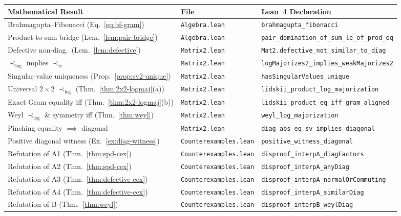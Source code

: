 \documentclass[11pt,a4paper]{article}
\theoremstyle{definition}
\begin{document}
\begin{table}[ht]
\centering
\footnotesize
\begin{tabular}{@{}lll@{}}
\toprule
\textbf{Mathematical Result} & \textbf{File} & \textbf{Lean~4 Declaration} \\
\midrule
Brahmagupta--Fibonacci (Eq.~\eqref{eq:bf-gram}) & \texttt{Algebra.lean} & \texttt{brahmagupta\_fibonacci} \\
Product-to-sum bridge (Lem.~\ref{lem:pair-bridge}) & \texttt{Algebra.lean} & \texttt{pair\_domination\_of\_sum\_le\_of\_prod\_eq} \\
Defective non-diag.\ (Lem.~\ref{lem:defective}) & \texttt{Matrix2.lean} & \texttt{Mat2.defective\_not\_similar\_to\_diag} \\
$\prec_{\log}$ implies $\prec_w$ & \texttt{Matrix2.lean} & \texttt{logMajorizes2\_implies\_weakMajorizes2} \\
Singular-value uniqueness (Prop.~\ref{prop:sv2-unique}) & \texttt{Matrix2.lean} & \texttt{hasSingularValues\_unique} \\
Universal $2\times 2$ $\prec_{\log}$ (Thm.~\ref{thm:2x2-logmaj}(a)) & \texttt{Matrix2.lean} & \texttt{lidskii\_product\_log\_majorization} \\
Exact Gram equality iff (Thm.~\ref{thm:2x2-logmaj}(b)) & \texttt{Matrix2.lean} & \texttt{lidskii\_product\_eq\_iff\_gram\_aligned} \\
Weyl $\prec_{\log}$ \& symmetry iff (Thm.~\ref{thm:weyl}) & \texttt{Matrix2.lean} & \texttt{weyl\_log\_majorization} \\
Pinching equality $\implies$ diagonal & \texttt{Matrix2.lean} & \texttt{diag\_abs\_eq\_sv\_implies\_diagonal} \\
Positive diagonal witness (Ex.~\ref{ex:diag-witness}) & \texttt{Counterexamples.lean} & \texttt{positive\_witness\_diagonal} \\
Refutation of A1 (Thm.~\ref{thm:spd-cex}) & \texttt{Counterexamples.lean} & \texttt{disproof\_interpA\_diagFactors} \\
Refutation of A2 (Thm.~\ref{thm:spd-cex}) & \texttt{Counterexamples.lean} & \texttt{disproof\_interpA\_anyDiag} \\
Refutation of A3 (Thm.~\ref{thm:defective-cex}) & \texttt{Counterexamples.lean} & \texttt{disproof\_interpA\_normalOrCommuting} \\
Refutation of A4 (Thm.~\ref{thm:defective-cex}) & \texttt{Counterexamples.lean} & \texttt{disproof\_interpA\_similarDiag} \\
Refutation of B (Thm.~\ref{thm:weyl}) & \texttt{Counterexamples.lean} & \texttt{disproof\_interpB\_weylDiag} \\

\end{tabular}
\end{table}
\end{document}
